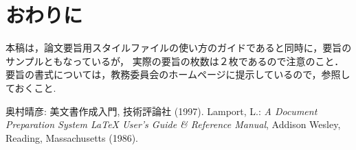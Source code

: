 \documentclass[twocolumn,a4paper,uplatex,dvipdfmx]{jarticle}
\begin{document}
\section{おわりに}
本稿は，論文要旨用スタイルファイルの使い方のガイドであると同時に，要旨のサンプルともなっているが，
実際の要旨の枚数は２枚であるので注意のこと．
要旨の書式については，教務委員会のホームページに提示しているので，参照しておくこと.

\begin{thebibliography}{9}
奥村晴彦: {\LaTeXe} 美文書作成入門, 技術評論社 (1997).
Lamport, L.: {\em A Document Preparation System {\LaTeX} User's Guide \&
  Reference Manual\/}, Addison Wesley, Reading, Massachusetts (1986).
\end{thebibliography}
\end{document}
